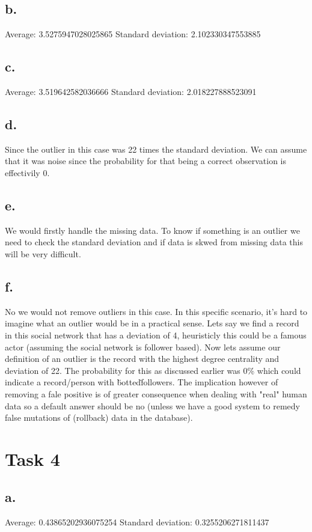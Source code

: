 \documentclass{article}
\begin{document}
\subsection*{b.}
Average: 3.5275947028025865
Standard deviation: 2.102330347553885
\subsection*{c.}
Average: 3.519642582036666
Standard deviation: 2.018227888523091

\subsection*{d.}
Since the outlier in this case was 22 times the standard deviation.
We can assume that it was noise since the probability for that being a correct observation is effectivily 0.

\subsection*{e.}
We would firstly handle the missing data. 
To know if something is an outlier we need to check the standard deviation and if data is skwed from missing data this will be very difficult.

\subsection*{f.}
No we would not remove outliers in this case. In this specific scenario, it's hard to imagine what an outlier would be in a practical sense.
Lets say we find a record in this social network that has a deviation of 4, heuristicly this could be a famous actor (assuming the social network is follower based).
Now lets assume our definition of an outlier is the record with the highest degree centrality and deviation of 22. The probability for this as discussed earlier was 0\%
which could indicate a record/person with \"botted\" followers. The implication however of removing a fale positive is of greater consequence when dealing with "real" human data
so a default answer should be no (unless we have a good system to remedy false mutations of (rollback) data in the database).

\section{Task 4}
\subsection*{a.}
Average: 0.43865202936075254
Standard deviation: 0.3255206271811437
\end{document}
